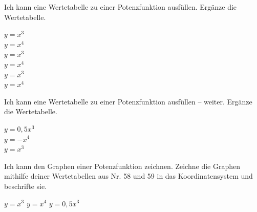 \setcounter{aufgabe}{57}


\begin{aufgabe}{Ich kann eine Wertetabelle zu einer Potenzfunktion ausfüllen.}
Ergänze die Wertetabelle.
\begin{teile}
\teil $y = x^3$ \\ 
\teil $y = x^4$ \\ 
\teil $y = x^3$ \\ 
\teil $y = x^4$ \\ 
\teil $y = x^3$ \\ 
\teil $y = x^4$ \\ 
\end{teile}
\end{aufgabe}

\begin{aufgabe}{Ich kann eine Wertetabelle zu einer Potenzfunktion ausfüllen – weiter.}
Ergänze die Wertetabelle.
\begin{teile}
\teil $y = 0{,}5x^3$ \\ 
\teil $y = -x^4$ \\ 
\teil $y = x^3$ \\ 
\end{teile}
\end{aufgabe}

\begin{aufgabe}{Ich kann den Graphen einer Potenzfunktion zeichnen.}
Zeichne die Graphen mithilfe deiner Wertetabellen aus Nr. 58 und 59 in das Koordinatensystem und beschrifte sie.
\begin{teile}
\teil $y = x^3$
\teil $y = x^4$
\teil $y = 0{,}5x^3$
\end{teile}

\begin{ksys}[xmin=-2,xmax=2,ymin=-8,ymax=8,xstep=0.5,ystep=2]
\end{ksys}

\end{aufgabe}

